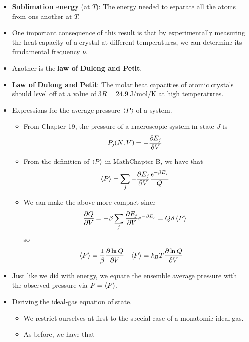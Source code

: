\documentclass[../notes.tex]{subfiles}
\begin{document}
\begin{itemize}
    \item \textbf{Sublimation energy} (at $T$): The energy needed to separate all the atoms from one another at $T$.
    \item One important consequence of this result is that by experimentally measuring the heat capacity of a crystal at different temperatures, we can determine its fundamental frequency $\nu$.
    \item Another is the \textbf{law of Dulong and Petit}.
    \item \textbf{Law of Dulong and Petit}: The molar heat capacities of atomic crystals should level off at a value of $3R=\SI{24.9}{\joule\per\mole\per\kelvin}$ at high temperatures.
    \item Expressions for the average pressure $\prb{P}$ of a system.
    \begin{itemize}
        \item From Chapter 19, the pressure of a macroscopic system in state $J$ is
        \begin{equation*}
            P_j(N,V) = -\pdv{E_j}{V}
        \end{equation*}
        \item From the definition of $\prb{P}$ in MathChapter B, we have that
        \begin{equation*}
            \prb{P} = \sum_j-\pdv{E_j}{V}\frac{\e[-\beta E_j]}{Q}
        \end{equation*}
        \item We can make the above more compact since
        \begin{equation*}
            \pdv{Q}{V} = -\beta\sum_j\pdv{E_j}{V}\e[-\beta E_j] = Q\beta\prb{P}
        \end{equation*}
        so
        \begin{align*}
            \prb{P} &= \frac{1}{\beta}\pdv{\ln Q}{V}&
            \prb{P} &= k_BT\pdv{\ln Q}{V}
        \end{align*}
    \end{itemize}
    \item Just like we did with energy, we equate the ensemble average pressure with the observed pressure via $P=\prb{P}$.
    \item Deriving the ideal-gas equation of state.
    \begin{itemize}
        \item We restrict ourselves at first to the special case of a monatomic ideal gas.
        \item As before, we have that

\end{itemize}
\end{itemize}
\end{document}
